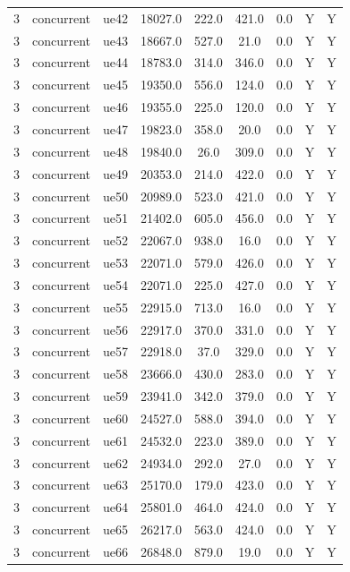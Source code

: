 \begin{table}[ht]
\begin{tabular}{|c|c|c|c|c|c|c|c|c|}
3 & concurrent & ue42 & 18027.0 & 222.0 & 421.0 & 0.0 & Y & Y \\
3 & concurrent & ue43 & 18667.0 & 527.0 & 21.0 & 0.0 & Y & Y \\
3 & concurrent & ue44 & 18783.0 & 314.0 & 346.0 & 0.0 & Y & Y \\
3 & concurrent & ue45 & 19350.0 & 556.0 & 124.0 & 0.0 & Y & Y \\
3 & concurrent & ue46 & 19355.0 & 225.0 & 120.0 & 0.0 & Y & Y \\
3 & concurrent & ue47 & 19823.0 & 358.0 & 20.0 & 0.0 & Y & Y \\
3 & concurrent & ue48 & 19840.0 & 26.0 & 309.0 & 0.0 & Y & Y \\
3 & concurrent & ue49 & 20353.0 & 214.0 & 422.0 & 0.0 & Y & Y \\
3 & concurrent & ue50 & 20989.0 & 523.0 & 421.0 & 0.0 & Y & Y \\
3 & concurrent & ue51 & 21402.0 & 605.0 & 456.0 & 0.0 & Y & Y \\
3 & concurrent & ue52 & 22067.0 & 938.0 & 16.0 & 0.0 & Y & Y \\
3 & concurrent & ue53 & 22071.0 & 579.0 & 426.0 & 0.0 & Y & Y \\
3 & concurrent & ue54 & 22071.0 & 225.0 & 427.0 & 0.0 & Y & Y \\
3 & concurrent & ue55 & 22915.0 & 713.0 & 16.0 & 0.0 & Y & Y \\
3 & concurrent & ue56 & 22917.0 & 370.0 & 331.0 & 0.0 & Y & Y \\
3 & concurrent & ue57 & 22918.0 & 37.0 & 329.0 & 0.0 & Y & Y \\
3 & concurrent & ue58 & 23666.0 & 430.0 & 283.0 & 0.0 & Y & Y \\
3 & concurrent & ue59 & 23941.0 & 342.0 & 379.0 & 0.0 & Y & Y \\
3 & concurrent & ue60 & 24527.0 & 588.0 & 394.0 & 0.0 & Y & Y \\
3 & concurrent & ue61 & 24532.0 & 223.0 & 389.0 & 0.0 & Y & Y \\
3 & concurrent & ue62 & 24934.0 & 292.0 & 27.0 & 0.0 & Y & Y \\
3 & concurrent & ue63 & 25170.0 & 179.0 & 423.0 & 0.0 & Y & Y \\
3 & concurrent & ue64 & 25801.0 & 464.0 & 424.0 & 0.0 & Y & Y \\
3 & concurrent & ue65 & 26217.0 & 563.0 & 424.0 & 0.0 & Y & Y \\
3 & concurrent & ue66 & 26848.0 & 879.0 & 19.0 & 0.0 & Y & Y \\

\end{tabular}
\end{table}
